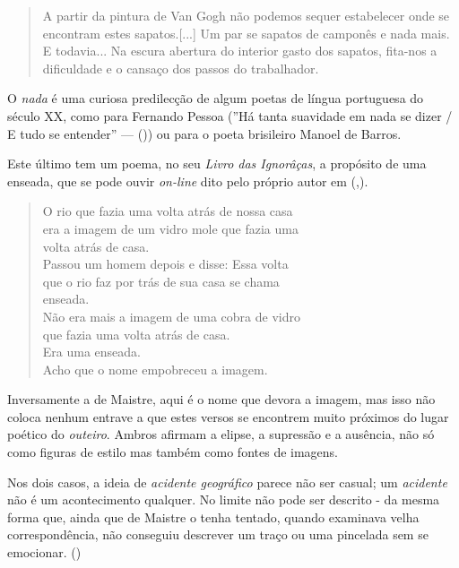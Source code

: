 \documentclass[12pt]{article}
\newenvironment{citacao}
{\begin{quote}
    \begin{small}
      \itshape
      \linespread{1}
}
{\end{small}\end{quote}}
\begin{document}
\singlespacing

\begin{citacao}
  A partir da pintura de Van Gogh não podemos sequer estabelecer onde
  se encontram estes sapatos.[...] Um par se sapatos de camponês e
  nada mais. E todavia...  Na escura abertura do interior gasto dos
  sapatos, fita-nos a dificuldade e o cansaço dos passos do
  trabalhador.
\end{citacao}

\doublespacing

O \emph{nada} é uma curiosa predilecção de algum poetas de língua
portuguesa do século XX, como para Fernando Pessoa (''Há tanta
suavidade em nada se dizer / E tudo se entender'' — (\cite{pessoa}))
ou para o poeta brisileiro Manoel de Barros.

Este último tem um poema, no seu \emph{Livro das Ignorâças}, a
propósito de uma enseada, que se pode ouvir \emph{on-line} dito pelo
próprio autor em (\cite{vidabreve},\cite{manoel}).

\singlespacing

\begin{citacao}
  O rio que fazia uma volta atrás de nossa casa\\
era a imagem de um vidro mole que fazia uma\\
volta atrás de casa.\\
Passou um homem depois e disse: Essa volta\\
que o rio faz por trás de sua casa se chama\\
enseada.\\
Não era mais a imagem de uma cobra de vidro\\
que fazia uma volta atrás de casa.\\
Era uma enseada.\\

Acho que o nome empobreceu a imagem. \\
\end{citacao}

\doublespacing

Inversamente a de Maistre, aqui é o nome que devora a imagem, mas isso
não coloca nenhum entrave a que estes versos se encontrem muito
próximos do lugar poético do \emph{outeiro}. Ambros afirmam a elipse,
a supressão e a ausência, não só como figuras de estilo mas também
como fontes de imagens.

Nos dois casos, a ideia de \emph{acidente geográfico} parece não ser
casual; um \emph{acidente} não é um acontecimento qualquer. No limite
não pode ser descrito - da mesma forma que, ainda que de Maistre o
tenha tentado, quando examinava velha correspondência, não conseguiu
descrever um traço ou uma pincelada sem se
emocionar. (\cite[p.84]{demaistre})
\end{document}
